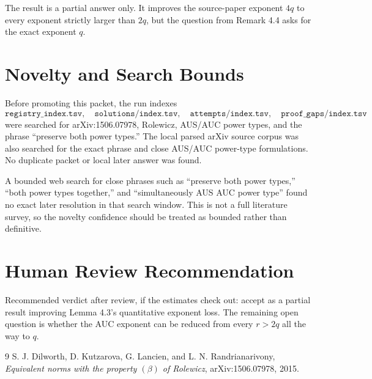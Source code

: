 \documentclass[11pt]{article}
\begin{document}
The result is a partial answer only. It improves the source-paper exponent
$4q$ to every exponent strictly larger than $2q$, but the question from Remark
4.4 asks for the exact exponent $q$.

\section*{Novelty and Search Bounds}

Before promoting this packet, the run indexes
\[
\texttt{registry\_index.tsv},\quad
\texttt{solutions/index.tsv},\quad
\texttt{attempts/index.tsv},\quad
\texttt{proof\_gaps/index.tsv}
\]
were searched for arXiv:1506.07978, Rolewicz, AUS/AUC power types, and the
phrase ``preserve both power types.'' The local parsed arXiv source corpus was
also searched for the exact phrase and close AUS/AUC power-type formulations.
No duplicate packet or local later answer was found.

A bounded web search for close phrases such as ``preserve both power types,''
``both power types together,'' and ``simultaneously AUS AUC power type'' found
no exact later resolution in that search window. This is not a full literature
survey, so the novelty confidence should be treated as bounded rather than
definitive.

\section*{Human Review Recommendation}

Recommended verdict after review, if the estimates check out: accept as a
partial result improving Lemma 4.3's quantitative exponent loss. The remaining
open question is whether the AUC exponent can be reduced from every $r>2q$ all
the way to $q$.

\begin{thebibliography}{9}
S. J. Dilworth, D. Kutzarova, G. Lancien, and L. N. Randrianarivony,
\emph{Equivalent norms with the property $(\beta)$ of Rolewicz},
arXiv:1506.07978, 2015.
\end{thebibliography}
\end{document}
